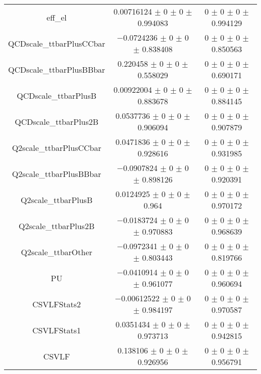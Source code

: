 \begin{table}
\begin{tabular}{ccc}
eff\_el 	& \num{0.00716124} $\pm$ \num{0} $\pm$ \num{0} $\pm$ \num{0.994083} 	& \num{0} $\pm$ \num{0} $\pm$ \num{0} $\pm$ \num{0.994129}\\
QCDscale\_ttbarPlusCCbar 	& \num{-0.0724236} $\pm$ \num{0} $\pm$ \num{0} $\pm$ \num{0.838408} 	& \num{0} $\pm$ \num{0} $\pm$ \num{0} $\pm$ \num{0.850563}\\
QCDscale\_ttbarPlusBBbar 	& \num{0.220458} $\pm$ \num{0} $\pm$ \num{0} $\pm$ \num{0.558029} 	& \num{0} $\pm$ \num{0} $\pm$ \num{0} $\pm$ \num{0.690171}\\
QCDscale\_ttbarPlusB 	& \num{0.00922004} $\pm$ \num{0} $\pm$ \num{0} $\pm$ \num{0.883678} 	& \num{0} $\pm$ \num{0} $\pm$ \num{0} $\pm$ \num{0.884145}\\
QCDscale\_ttbarPlus2B 	& \num{0.0537736} $\pm$ \num{0} $\pm$ \num{0} $\pm$ \num{0.906094} 	& \num{0} $\pm$ \num{0} $\pm$ \num{0} $\pm$ \num{0.907879}\\
Q2scale\_ttbarPlusCCbar 	& \num{0.0471836} $\pm$ \num{0} $\pm$ \num{0} $\pm$ \num{0.928616} 	& \num{0} $\pm$ \num{0} $\pm$ \num{0} $\pm$ \num{0.931985}\\
Q2scale\_ttbarPlusBBbar 	& \num{-0.0907824} $\pm$ \num{0} $\pm$ \num{0} $\pm$ \num{0.898126} 	& \num{0} $\pm$ \num{0} $\pm$ \num{0} $\pm$ \num{0.920391}\\
Q2scale\_ttbarPlusB 	& \num{0.0124925} $\pm$ \num{0} $\pm$ \num{0} $\pm$ \num{0.964} 	& \num{0} $\pm$ \num{0} $\pm$ \num{0} $\pm$ \num{0.970172}\\
Q2scale\_ttbarPlus2B 	& \num{-0.0183724} $\pm$ \num{0} $\pm$ \num{0} $\pm$ \num{0.970883} 	& \num{0} $\pm$ \num{0} $\pm$ \num{0} $\pm$ \num{0.968639}\\
Q2scale\_ttbarOther 	& \num{-0.0972341} $\pm$ \num{0} $\pm$ \num{0} $\pm$ \num{0.803443} 	& \num{0} $\pm$ \num{0} $\pm$ \num{0} $\pm$ \num{0.819766}\\
PU 	& \num{-0.0410914} $\pm$ \num{0} $\pm$ \num{0} $\pm$ \num{0.961077} 	& \num{0} $\pm$ \num{0} $\pm$ \num{0} $\pm$ \num{0.960694}\\
CSVLFStats2 	& \num{-0.00612522} $\pm$ \num{0} $\pm$ \num{0} $\pm$ \num{0.984197} 	& \num{0} $\pm$ \num{0} $\pm$ \num{0} $\pm$ \num{0.970587}\\
CSVLFStats1 	& \num{0.0351434} $\pm$ \num{0} $\pm$ \num{0} $\pm$ \num{0.973713} 	& \num{0} $\pm$ \num{0} $\pm$ \num{0} $\pm$ \num{0.942815}\\
CSVLF 	& \num{0.138106} $\pm$ \num{0} $\pm$ \num{0} $\pm$ \num{0.926956} 	& \num{0} $\pm$ \num{0} $\pm$ \num{0} $\pm$ \num{0.956791}\\

\end{tabular}
\end{table}
